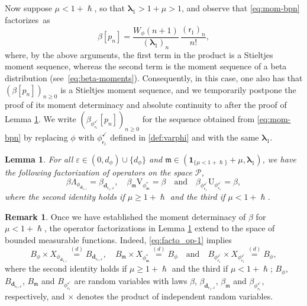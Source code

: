 \documentclass[10pt]{amsart}
\let\epsilon\varepsilon
\theoremstyle{plain}
\newtheorem{lemma}[theorem]{Lemma}
\theoremstyle{definition}
\newtheorem{remark}[theorem]{Remark}
\newcommand{\Poly}{\mathscr{P}}
\newcommand{\m}{\mathfrak{m}}
\newcommand{\dpt}{\bm{d}_{\vat,\epsilon}}
\newcommand{\dz}{{\bm{d}}_{1,\epsilon}}
\newcommand{\lam}{{\bm{\lambda}_1}}
\newcommand{\vat}{{\mathsf{r}_1}}
\newcommand{\phm}{{\phi_\m^*}}
\renewcommand{\varphi}{{\phi_{\vat}^{\checkmark}}}
\newcommand{\gab}[1][\lam,\mo]{{\beta_{#1}}}
\let\h\hslash
\let\mo\mu
\let\bpsi\beta
\begin{document}
Now suppose $\mo\!<\!1+\h$, so that $\lam\!>\!1+\mo\!>\!1$, and observe that \eqref{eq:mom-bpn} factorizes~as
\begin{equation*}
\bpsi [p_n] = \frac{W_{\phi}(n+1)}{(\lam)_n}\, \frac{(\vat)_n}{n!},
\end{equation*}
where, by the above arguments, the first term in the product is a Stieltjes moment sequence, whereas the second term is the moment sequence of a beta distribution (see~\eqref{eq:beta-moments}). Consequently, in this case, one also has that $(\bpsi [p_n])_{n \geq 0}$ is a Stieltjes moment sequence, and we temporarily postpone the proof of its moment determinacy and absolute continuity to after the proof of Lemma \ref{lem:fact}. We write $(\bpsi_\varphi [p_n])_{n \geq 0}$ for the sequence obtained from \eqref{eq:mom-bpn} by replacing $\phi$ with $\varphi$ defined in \eqref{def:varphi} and with the same $\lam$.

\begin{lemma}
\label{lem:fact}
For all $\epsilon \in (0,d_\phi) \cup \{d_\phi\}$ and $\m \in (\bm{1}_{\{\mo < 1+\h\}} + \mo, \lam)$,
we have the following factorization of operators on the space $\Poly$,
\begin{equation}
\label{eq:facto_op-1}
\bpsi \Lambda_{\phi_{\dz}} = \gab[\dpt], \quad \gab[\m] \mathrm{V}_{\phm} = \bpsi \quad \text{and} \quad \bpsi_\varphi \mathrm{U}_\varphi = \bpsi,
\end{equation}
where the second identity holds if $\mo \geq 1+\h$ and the third if $\mo < 1+\h$.
\end{lemma}

\begin{remark}
\label{rem:facto}
Once we have established the moment determinacy of $\bpsi$ for $\mo < 1+\h$, the operator factorizations in
Lemma \ref{lem:fact} extend to the space of bounded measurable functions. Indeed, \eqref{eq:facto_op-1} implies
\begin{equation*}
B_\phi \times X_{\phi_{\dz}} \stackrel{(d)}{=} B_{\dpt}, \quad B_{\m} \times X_{\phi^*_{\m}} \stackrel{(d)}{=} B_{\phi}
\quad \mbox{and} \quad B_{\varphi} \times X_{\varphi} \stackrel{(d)}{=} B_{\phi},
\end{equation*}
where the second identity holds if $\mo \geq 1+\h$ and the third if $\mo < 1+\h$;
$B_\phi$, $B_{\dpt}$, $B_{\m}$ and $B_{\varphi}$ are random variables with laws
$\bpsi$, $\gab[\dpt]$, $\beta_{\m}$ and $\beta_{\varphi}$, respectively, and $\times$ denotes the
product of independent random variables.
\end{remark}
\end{document}
